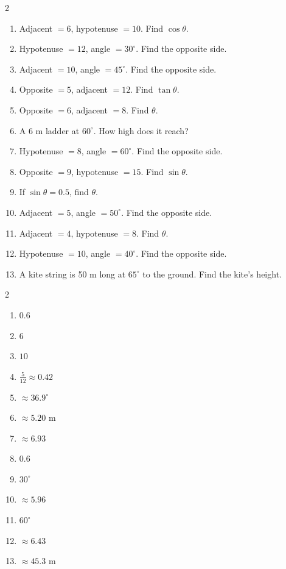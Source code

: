 \documentclass[11pt]{article}
\begin{document}
\begin{recapbox}
\begin{multicols}{2}
\small
\begin{enumerate}[leftmargin=*,itemsep=3pt]
  \item Adjacent $=6$, hypotenuse $=10$. Find $\cos\theta$.
  \item Hypotenuse $=12$, angle $=30^\circ$. Find the opposite side.
  \item Adjacent $=10$, angle $=45^\circ$. Find the opposite side.
  \item Opposite $=5$, adjacent $=12$. Find $\tan\theta$.
  \item Opposite $=6$, adjacent $=8$. Find $\theta$.
  \item A 6 m ladder at $60^\circ$. How high does it reach?
  \item Hypotenuse $=8$, angle $=60^\circ$. Find the opposite side.
  \item Opposite $=9$, hypotenuse $=15$. Find $\sin\theta$.
  \item If $\sin\theta=0.5$, find $\theta$.
  \item Adjacent $=5$, angle $=50^\circ$. Find the opposite side.
  \item Adjacent $=4$, hypotenuse $=8$. Find $\theta$.
  \item Hypotenuse $=10$, angle $=40^\circ$. Find the opposite side.
  \item A kite string is 50 m long at $65^\circ$ to the ground. Find the kite's height.
\end{enumerate}
\end{multicols}
\end{recapbox}

\begin{keybox}
\begin{multicols}{2}
\small
\begin{enumerate}[leftmargin=*,itemsep=3pt]
  \item $0.6$
  \item $6$
  \item $10$
  \item $\tfrac{5}{12}\approx0.42$
  \item $\approx36.9^\circ$
  \item $\approx5.20$ m
  \item $\approx6.93$
  \item $0.6$
  \item $30^\circ$
  \item $\approx5.96$
  \item $60^\circ$
  \item $\approx6.43$
  \item $\approx45.3$ m
\end{enumerate}
\end{multicols}
\end{keybox}
\end{document}
